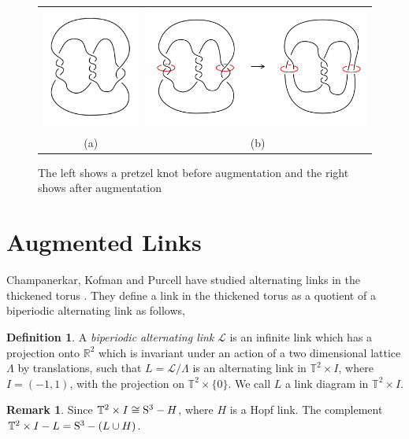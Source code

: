 \documentclass[11pt]{amsart}
\newcommand{\Sp}{{\rm{S}}}
\newcommand{\R}{\mathbb{R}}
\newcommand{\torus}{{\mathbb{T}^2}}
\theoremstyle{plain}
\theoremstyle{definition}
\newtheorem{define}[theorem]{Definition}
\newtheorem{remark}[theorem]{Remark}
\begin{document}
 \begin{figure}
 \centering  
 \begin{tabular}{cc}
 \includegraphics [height=4cm]{augmentation1}&
  \includegraphics [height=4cm]{augmentation2}\\
  (a)&(b)
  \end{tabular}
 \caption{The left shows a pretzel knot before augmentation and the right shows after augmentation}
 \label{fig:augmentationS3}
 \end{figure}
 
 
\section{Augmented Links}
\label{s:auglinks}

Champanerkar, Kofman and Purcell have studied alternating links in the thickened torus \cite{CKP2}. They define a link in the thickened torus as a quotient of a biperiodic alternating link as follows,
 
\begin{define}
\label{def:biperiodiclink}
A \emph{biperiodic alternating link} $\mathcal{L}$ is an infinite link
which has a projection onto
$\R^2$ which is invariant under an action of a two dimensional lattice $\Lambda$
by translations, such that $L=\mathcal{L}/\Lambda$ is an alternating link in
$\torus \times I$, where $I = (-1,1)$, with the projection on $\torus \times \{0\}$.
We call $L$ a link diagram in $\torus \times I$.   
\end{define}

\begin{remark}
Since $\torus \times I \cong \Sp^3 - H$, where $H$ is a Hopf link. The complement $\torus \times I- L = \Sp^3 - (L \cup H)$.
\end{remark}
\end{document}
